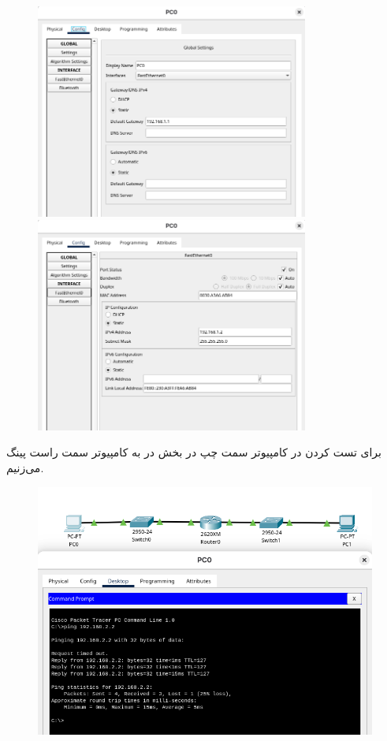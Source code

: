 \begin{figure}[h]
    \centering
    \includegraphics[width=0.8\textwidth]{img/8.png}
    \includegraphics[width=0.8\textwidth]{img/9.png}
\end{figure}

\clearpage
برای تست کردن در کامپیوتر سمت چپ در بخش  در  به کامپیوتر سمت راست پینگ می‌زنیم.

\begin{figure}[h]
    \centering
    \includegraphics[width=1\textwidth]{img/10.png}
\end{figure}